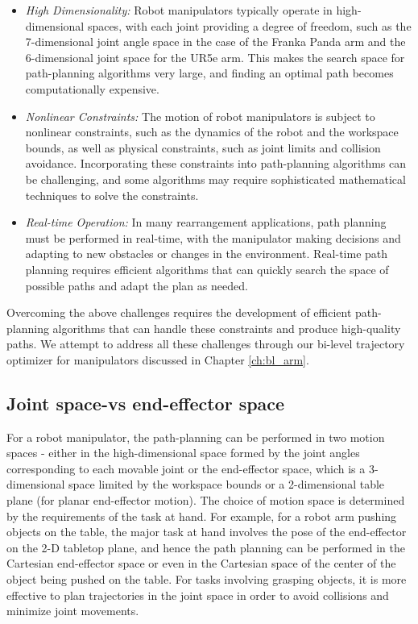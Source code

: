 \begin{itemize}
    \item \textit{High Dimensionality:} Robot manipulators typically operate in high-dimensional spaces, with each joint providing a degree of freedom, such as the 7-dimensional joint angle space in the case of the Franka Panda arm and the 6-dimensional joint space for the UR5e arm. This makes the search space for path-planning algorithms very large, and finding an optimal path becomes computationally expensive.
    \item \textit{Nonlinear Constraints:}  The motion of robot manipulators is subject to nonlinear constraints, such as the dynamics of the robot and the workspace bounds, as well as physical constraints, such as joint limits and collision avoidance. Incorporating these constraints into path-planning algorithms can be challenging, and some algorithms may require sophisticated mathematical techniques to solve the constraints.
    \item \textit{Real-time Operation:}  In many rearrangement applications, path planning must be performed in real-time, with the manipulator making decisions and adapting to new obstacles or changes in the environment. Real-time path planning requires efficient algorithms that can quickly search the space of possible paths and adapt the plan as needed.
\end{itemize}

Overcoming the above challenges requires the development of efficient path-planning algorithms that can handle these constraints and produce high-quality paths. We attempt to address all these challenges through our bi-level trajectory optimizer for manipulators discussed in Chapter \ref{ch:bl_arm}.

\subsection{Joint space-vs end-effector space}

For a robot manipulator, the path-planning can be performed in two motion spaces - either in the high-dimensional space formed by the joint angles corresponding to each movable joint or the end-effector space, which is a 3-dimensional space limited by the workspace bounds  or a 2-dimensional table plane (for planar end-effector motion). The choice of motion space is determined by the requirements of the task at hand. For example, for a robot arm pushing objects on the table, the major task at hand involves the pose of the end-effector on the 2-D tabletop plane, and hence the path planning can be performed in the Cartesian end-effector space or even in the Cartesian space of the center of the object being pushed on the table. For tasks involving grasping objects, it is more effective to plan trajectories in the joint space in order to avoid collisions and minimize joint movements. 

